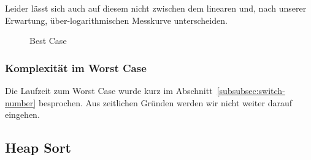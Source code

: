 Leider lässt sich auch auf diesem nicht zwischen dem linearen und, nach
unserer Erwartung, über-logarithmischen Messkurve unterscheiden.

\begin{figure}[hbt]
    \centering
    \caption{Best Case}
\end{figure}

\subsubsection{Komplexität im Worst Case}\label{subsubsec:worst-case}
Die Laufzeit zum Worst Case wurde kurz im
Abschnitt~\ref{subsubsec:switch-number} besprochen.
Aus zeitlichen Gründen werden wir nicht weiter darauf eingehen.


\FloatBarrier

\subsection{Heap Sort}\label{subsec:heap-sort-laufzeit}
